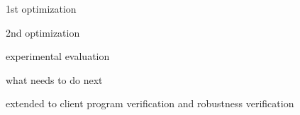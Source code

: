 \begin{frame}
	1st optimization
\end{frame}

\begin{frame}
	2nd optimization
\end{frame}

\begin{frame}
	experimental evaluation
\end{frame}

\begin{frame}
	what needs to do next
\end{frame}

\begin{frame}
	extended to client program verification and robustness verification
\end{frame}
